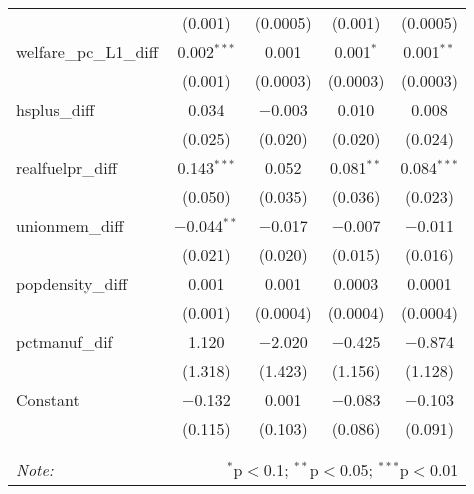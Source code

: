 \begin{table}[!htbp]
\begin{tabular}{@{\extracolsep{5pt}}lcccc}
  & (0.001) & (0.0005) & (0.001) & (0.0005) \\ 
  welfare\_pc\_L1\_diff & 0.002$^{***}$ & 0.001 & 0.001$^{*}$ & 0.001$^{**}$ \\ 
  & (0.001) & (0.0003) & (0.0003) & (0.0003) \\ 
  hsplus\_diff & 0.034 & $-$0.003 & 0.010 & 0.008 \\ 
  & (0.025) & (0.020) & (0.020) & (0.024) \\ 
  realfuelpr\_diff & 0.143$^{***}$ & 0.052 & 0.081$^{**}$ & 0.084$^{***}$ \\ 
  & (0.050) & (0.035) & (0.036) & (0.023) \\ 
  unionmem\_diff & $-$0.044$^{**}$ & $-$0.017 & $-$0.007 & $-$0.011 \\ 
  & (0.021) & (0.020) & (0.015) & (0.016) \\ 
  popdensity\_diff & 0.001 & 0.001 & 0.0003 & 0.0001 \\ 
  & (0.001) & (0.0004) & (0.0004) & (0.0004) \\ 
  pctmanuf\_dif & 1.120 & $-$2.020 & $-$0.425 & $-$0.874 \\ 
  & (1.318) & (1.423) & (1.156) & (1.128) \\ 
  Constant & $-$0.132 & 0.001 & $-$0.083 & $-$0.103 \\ 
  & (0.115) & (0.103) & (0.086) & (0.091) \\ 
 \hline \\[-1.8ex] 
\hline 
\hline \\[-1.8ex] 
\textit{Note:}  & \multicolumn{4}{r}{$^{*}$p$<$0.1; $^{**}$p$<$0.05; $^{***}$p$<$0.01} \\ 
\end{tabular} 
\end{table} 
